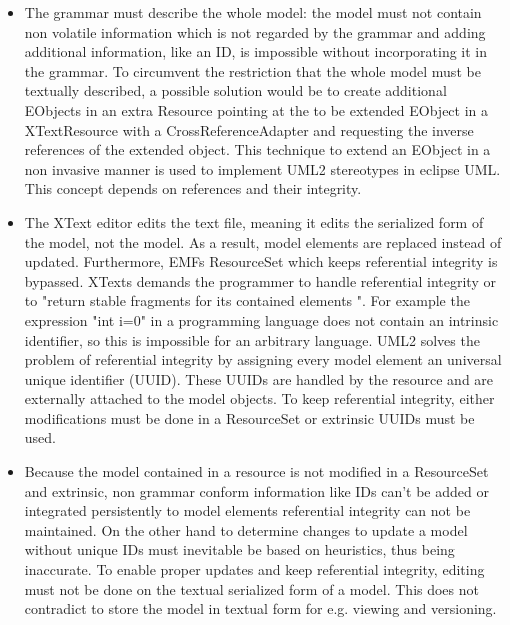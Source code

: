 \begin{itemize}
	\item The grammar must describe the whole model: the model must not contain non volatile information which is not regarded by the grammar and adding additional information, like an ID, is impossible without incorporating it in the grammar. To circumvent the restriction that the whole model must be textually described, a possible solution would be to create additional EObjects in an extra Resource pointing at the to be extended EObject in a XTextResource with a CrossReferenceAdapter and requesting the inverse references of  the extended object. This technique to extend an EObject in a non invasive manner is used to implement UML2 stereotypes in eclipse UML. This concept depends on references and their integrity.
	\item The XText editor edits the text file, meaning it edits the serialized form of the model, not the model. As a result, model elements are replaced instead of updated. Furthermore, EMFs ResourceSet which keeps referential integrity is bypassed. XTexts demands the programmer to handle referential integrity or to "return stable fragments for its contained elements ". For example the expression "int i=0" in a programming language does not contain an intrinsic identifier, so this is impossible for an arbitrary language. UML2 solves the problem of referential integrity by assigning every model element an universal unique identifier (UUID). These UUIDs are handled by the resource and are  externally attached to the model objects. To keep referential integrity, either modifications must be done in a ResourceSet or extrinsic UUIDs must be used. 
	\item Because the model contained in a resource is not modified in a ResourceSet and extrinsic, non grammar conform information like IDs can't be added or integrated persistently to model elements referential integrity can not be maintained. On the other hand to determine changes to update a model without unique IDs must inevitable  be based on heuristics, thus being inaccurate.  To enable proper updates and keep referential integrity, editing must not be done on the textual serialized form of a model. This does not contradict to store the model in textual form for e.g. viewing and versioning. 
\end{itemize}

